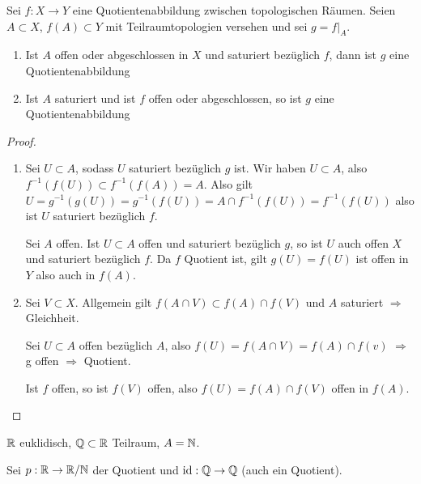 \documentclass{skript}
\begin{document}
\begin{stz}
    Sei $f:X\to Y$ eine Quotientenabbildung zwischen topologischen Räumen. Seien
    $A\subset X$, $f(A)\subset Y$ mit Teilraumtopologien versehen und sei $g =
    f|_A$.
    \begin{enumerate}
        \item Ist $A$ offen oder abgeschlossen in $X$ und saturiert bezüglich
            $f$, dann ist $g$ eine Quotientenabbildung
        \item Ist $A$ saturiert und ist $f$ offen oder abgeschlossen, so ist $g$
            eine Quotientenabbildung
    \end{enumerate}
    \begin{proof}
        \begin{enumerate}
            \item Sei $U\subset A$, sodass $U$ saturiert bezüglich $g$ ist. Wir
                haben $U\subset A$, also $f^{-1}(f(U))\subset f^{-1}(f(A)) = A$.
                Also gilt $U = g^{-1}(g(U)) = g^{-1}(f(U)) = A \cap
                f^{-1}(f(U)) = f^{-1}(f(U))$ also ist $U$ saturiert bezüglich
                $f$.
                
                Sei $A$ offen. Ist $U\subset A$ offen und saturiert bezüglich
                $g$, so ist $U$ auch offen $X$ und saturiert bezüglich $f$. Da
                $f$ Quotient ist, gilt $g(U) = f(U)$ ist offen in $Y$ also auch
                in $f(A)$.
            \item Sei $V\subset X$. Allgemein gilt $f(A\cap V)\subset f(A) \cap
                f(V)$ und $A$ saturiert $\Rightarrow$ Gleichheit.

                Sei $U\subset A$ offen bezüglich $A$, also $f(U) = f(A\cap V) =
                f(A) \cap f(v)$ $\Rightarrow$ g offen $\Rightarrow$ Quotient.

                Ist $f$ offen, so ist $f(V)$ offen, also $f(U) = f(A) \cap f(V)$
                offen in $f(A)$.
        \end{enumerate}
    \end{proof}
    \begin{bsp}
        $\mathbb{R}$ euklidisch, $\mathbb{Q}\subset \mathbb{R}$ Teilraum, $A = \mathbb{N}$.

        Sei $p:\mathbb{R}\to\mathbb{R}/\mathbb{N}$ der Quotient und $\operatorname{id} : \mathbb{Q}\to\mathbb{Q}$ (auch
        ein Quotient).


\end{bsp}
\end{stz}
\end{document}
